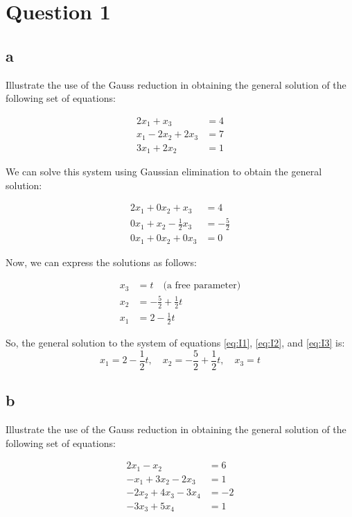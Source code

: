 \section{Question 1}
\subsection{a}
Illustrate the use of the Gauss reduction in obtaining the general solution of the following set of equations:

\begin{align}
	2x_1 + x_3 &= 4 \label{eq:I1} \\
	x_1 - 2x_2 + 2x_3 &= 7 \label{eq:I2} \\
	3x_1 + 2x_2 &= 1 \label{eq:I3}
\end{align}

We can solve this system using Gaussian elimination to obtain the general solution:

\begin{align*}
	2x_1 + 0x_2 + x_3 &= 4 \tag{1'} \\
	0x_1 + x_2 - \frac{1}{2}x_3 &= -\frac{5}{2} \tag{2'} \\
	0x_1 + 0x_2 + 0x_3 &= 0 \tag{3'}
\end{align*}

Now, we can express the solutions as follows:

\begin{align*}
	x_3 &= t \quad \text{(a free parameter)} \\
	x_2 &= -\frac{5}{2} + \frac{1}{2}t \\
	x_1 &= 2 - \frac{1}{2}t
\end{align*}

So, the general solution to the system of equations \eqref{eq:I1}, \eqref{eq:I2}, and \eqref{eq:I3} is:
\[
x_1 = 2 - \frac{1}{2}t, \quad x_2 = -\frac{5}{2} + \frac{1}{2}t, \quad x_3 = t
\]

\subsection{b}
Illustrate the use of the Gauss reduction in obtaining the general solution of the following set of equations:

\begin{align}
	2x_1 - x_2 &= 6 \label{eq:II1} \\
	-x_1 + 3x_2 - 2x_3 &= 1 \label{eq:II2} \\
	-2x_2 + 4x_3 - 3x_4 &= -2 \label{eq:II3} \\
	-3x_3 + 5x_4 &= 1 \label{eq:II4}
\end{align}

